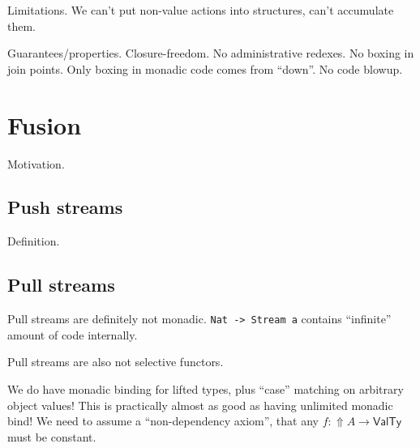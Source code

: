 \documentclass[acmsmall,screen,review,anonymous]{acmart}
\newcommand{\msf}[1]{\mathsf{#1}}
\newcommand{\Lift}{{\Uparrow}}
\theoremstyle{remark}
\begin{document}
Limitations. We can't put non-value actions into structures, can't accumulate them.

Guarantees/properties. Closure-freedom. No administrative redexes. No boxing in join points.
Only boxing in monadic code comes from ``down''. No code blowup.

\section{Fusion}\label{sec:push-pull-fusion}

Motivation.


\subsection{Push streams}\label{sec:push-streams}

Definition.

\subsection{Pull streams}\label{sec:pull-streams}

Pull streams are definitely not monadic. \texttt{Nat -> Stream a} contains
``infinite'' amount of code internally.

Pull streams are also not selective functors.

We do have monadic binding for lifted types, plus ``case'' matching
on arbitrary object values! This is practically almost as good as
having unlimited monadic bind! We need to assume a ``non-dependency axiom'',
that any $f : \Lift A \to \msf{ValTy}$ must be constant.


\end{document}

